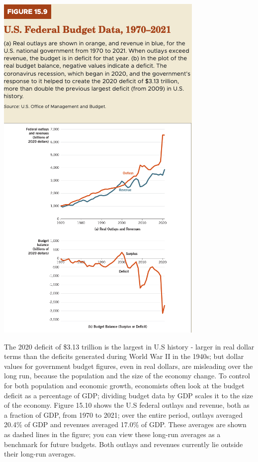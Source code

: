 \documentclass[11pt]{article} %
\begin{document}
\begin{center}
\includegraphics[scale=0.4]{images/Figure 15.9.png}
\end{center}
The 2020 deficit of \$3.13 trillion is the largest in U.S history - larger in real dollar terms than the deficits generated during World War II in the 1940s; but dollar values for government budget figures, even in real dollars, are misleading over the long run, because the population and the size of the economy change. To control for both population and economic growth, economists often look at the budget deficit as a percentage of GDP; dividing budget data by GDP scales it to the size of the economy. Figure 15.10 shows the U.S federal outlays and revenue, both as a fraction of GDP, from 1970 to 2021; over the entire period, outlays averaged 20.4\% of GDP and revenues averaged 17.0\% of GDP. These averages are shown as dashed lines in the figure; you can view these long-run averages as a benchmark for future budgets. Both outlays and revenues currently lie outside their long-run averages.
\end{document}
